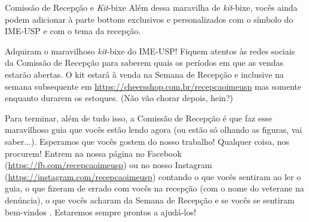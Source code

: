 \begin{secao}{Comissão de Recepção e \textit{Kit}-bixe}
Além dessa maravilha de \textit{kit}-bixe, vocês ainda podem adicionar à parte bottons
exclusivos e personalizados com o símbolo do IME-USP e com o tema da recepção.

Adquiram o maravilhoso \textit{kit}-bixe do IME-USP! Fiquem atentos às redes sociais da
Comissão de Recepção para saberem quais os períodos em que as vendas estarão abertas.
O kit estará à venda na Semana de Recepção e inclusive na semana subsequente em
\url{https://cheersshop.com.br/recepcaoimeusp} mas somente enquanto
durarem os estoques. (Não vão chorar depois, hein?)

Para terminar, além de tudo isso, a Comissão de Recepção é que faz esse maravilhoso guia que
vocês estão lendo agora (ou estão só olhando as figuras, vai
saber...). Esperamos que vocês gostem do nosso trabalho! Qualquer coisa, nos
procurem! Entrem na nossa página no Facebook (\url{https://fb.com/recepcaoimeusp}) ou no nosso
Instagram (\url{https://instagram.com/recepcaoimeusp}) contando
o que vocês sentiram ao ler o guia, o que fizeram de errado com vocês na
recepção (com o nome do veterane na denúncia), o que vocês acharam da Semana
de Recepção e se vocês se sentiram bem-vindos . Estaremos sempre prontos a ajudá-los!
\end{secao}
